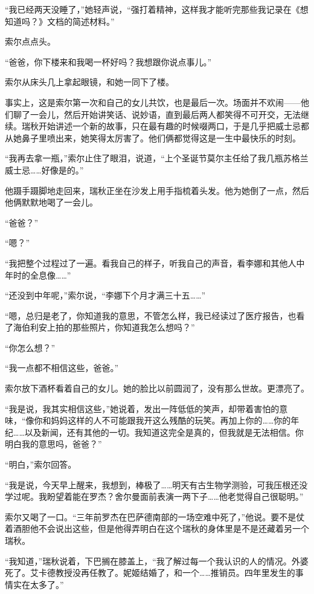 \documentclass[AutoFakeBold=true]{book}
\begin{document}
``我已经两天没睡了，''她轻声说，``强打着精神，这样我才能听完那些我记录在《想知道吗？》文档的简述材料。''

索尔点点头。

``爸爸，你下楼来和我喝一杯好吗？我想跟你说点事儿。''

索尔从床头几上拿起眼镜，和她一同下了楼。

事实上，这是索尔第一次和自己的女儿共饮，也是最后一次。场面并不欢闹——他们聊了一会儿，然后开始讲笑话、说妙语，直到最后两人都笑得不可开交，无法继续。瑞秋开始讲述一个新的故事，只在最有趣的时候啜两口，于是几乎把威士忌都从她鼻子里喷出来，她笑得太厉害了。他们俩都觉得这是一生中最快乐的时刻。

``我再去拿一瓶，''索尔止住了眼泪，说道，``上个圣诞节莫尔主任给了我几瓶苏格兰威士忌……好像是的。''

他蹑手蹑脚地走回来，瑞秋正坐在沙发上用手指梳着头发。他为她倒了一点，然后他俩默默地喝了一会儿。

``爸爸？''

``嗯？''

``我把整个过程过了一遍。看我自己的样子，听我自己的声音，看李娜和其他人中年时的全息像……''

``还没到中年呢，''索尔说，``李娜下个月才满三十五……''

``嗯，总归是老了，你知道我的意思，不管怎么样，我已经读过了医疗报告，也看了海伯利安上拍的那些照片，你知道我怎么想吗？''

``你怎么想？''

``我一点都不相信这些，爸爸。''

索尔放下酒杯看着自己的女儿。她的脸比以前圆润了，没有那么世故。更漂亮了。

``我是说，我其实相信这些，''她说着，发出一阵低低的笑声，却带着害怕的意味，``像你和妈妈这样的人不可能跟我开这么残酷的玩笑。再加上你的……你的年纪……以及新闻，还有其他的一切。我知道这完全是真的，但我就是无法相信。你明白我的意思吗，爸爸？''

``明白，''索尔回答。

``我是说，今天早上醒来，我想到，棒极了……明天有古生物学测验，可我压根还没学过呢。我盼望着能在罗杰？舍尔曼面前表演一两下子……他老觉得自己很聪明。''

索尔又喝了一口。``三年前罗杰在巴萨德南部的一场空难中死了，''他说。要不是仗着酒胆他不会说出这些，但是他得弄明白在这个瑞秋的身体里是不是还藏着另一个瑞秋。

``我知道，''瑞秋说着，下巴搁在膝盖上，``我了解过每一个我认识的人的情况。外婆死了。艾卡德教授没再任教了。妮姬结婚了，和一个……推销员。四年里发生的事情实在太多了。''
\end{document}
